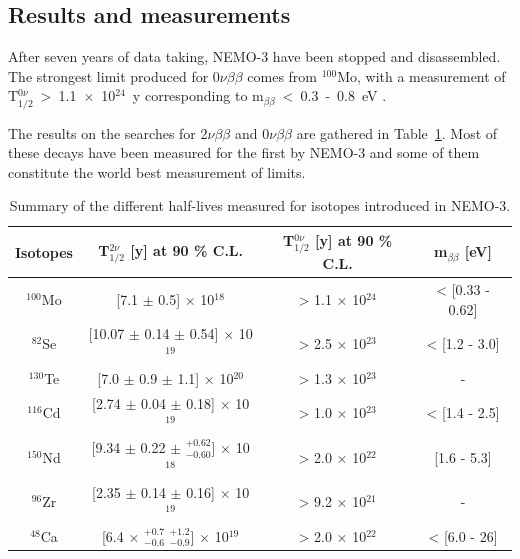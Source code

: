\documentclass[main.tex]{subfiles}
\begin{document}
\FloatBarrier


\FloatBarrier

\subsection{Results and measurements}


\NI After seven years of data taking, NEMO-3 have been stopped and disassembled. The strongest limit produced for 0$\nu\beta\beta$ comes from $^{\text{100}}$Mo, with a measurement of T$_{\text{1/2}}^{\text{0}\nu}$~>~1.1~$\times$~10$^{\text{24}}$~y corresponding to m$_{\beta\beta}$~<~0.3~-~0.8~eV \cite{NEMO3:Mo100}.


\bigskip


\NI  The results on the searches for 2$\nu\beta\beta$ and 0$\nu\beta\beta$ are gathered in Table~\ref{tab:SummaryDecayRateNEMO3}. Most of these decays have been measured for the first by NEMO-3 and some of them constitute the world best measurement of limits. 


\bigskip


\begin{table}[h!]
\centering
\begin{tabular}{c|c|c|c}
Isotopes & T$_{\text{1/2}}^{\text{2}\nu}$ [y] at 90 \% C.L. & T$_{\text{1/2}}^{\text{0}\nu}$ [y] at 90 \% C.L. & m$_{\beta\beta}$ [eV] \\
\toprule
$^{\text{100}}$Mo \cite{NEMO3:Mo100} & [7.1 $\pm$ 0.5] $\times$ 10$^{\text{18}}$ & > 1.1 $\times$ 10$^{\text{24}}$ & < [0.33 - 0.62]  \\[0.1cm]
$^{\text{82}}$Se \cite{NEMO3:Se82} & [10.07 $\pm$ 0.14 $\pm$ 0.54] $\times$ 10$^{\text{19}}$ & > 2.5 $\times$ 10$^{\text{23}}$  & < [1.2 - 3.0]  \\[0.1cm]
$^{\text{130}}$Te \cite{NEMO3:Te130}& [7.0 $\pm$ 0.9 $\pm$ 1.1] $\times$ 10$^{\text{20}}$ & > 1.3 $\times$ 10$^{\text{23}}$  & - \\[0.1cm]
$^{\text{116}}$Cd \cite{Arnold2016bed}& [2.74 $\pm$ 0.04 $\pm$ 0.18] $\times$ 10$^{\text{19}}$ & > 1.0 $\times$ 10$^{\text{23}}$  & < [1.4 - 2.5]  \\[0.1cm]
$^{\text{150}}$Nd \cite{NEMO3:Nd150}& [9.34 $\pm$ 0.22 $\pm$ $^{+\text{0.62}}_{-\text{0.60}}$] $\times$ 10$^{\text{18}}$ & > 2.0 $\times$ 10$^{\text{22}}$  & [1.6 - 5.3] \\[0.1cm]
$^{\text{96}}$Zr  \cite{NEMO3:Zr96}& [2.35 $\pm$ 0.14 $\pm$ 0.16] $\times$ 10$^{\text{19}}$ & > 9.2 $\times$ 10$^{\text{21}}$  & - \\[0.1cm]
$^{\text{48}}$Ca \cite{NEMO3:Ca48} & [6.4 $\times$ $^{+\text{0.7}}_{-\text{0.6}}$ $^{+\text{1.2}}_{-\text{0.9}}$] $\times$ 10$^{\text{19}}$ & > 2.0 $\times$ 10$^{\text{22}}$  & < [6.0 - 26] \\[0.1cm]
\bottomrule
\end{tabular}
\caption{Summary of the different half-lives measured for isotopes introduced in NEMO-3.}
\label{tab:SummaryDecayRateNEMO3}
\end{table}
\end{document}
